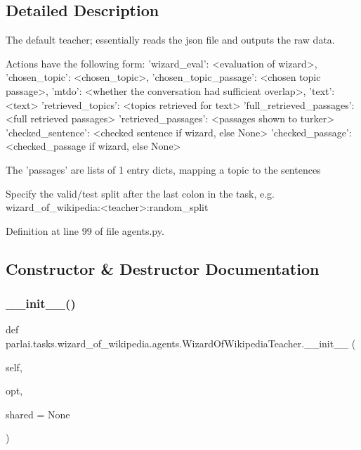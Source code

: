 \subsection{Detailed Description}
\begin{DoxyVerb}The default teacher; essentially reads the json file and outputs the raw data.

Actions have the following form:
{
    'wizard_eval': <evaluation of wizard>,
    'chosen_topic': <chosen_topic>,
    'chosen_topic_passage': <chosen topic passage>,
    'mtdo': <whether the conversation had sufficient overlap>,
    'text': <text>
    'retrieved_topics': <topics retrieved for text>
    'full_retrieved_passages': <full retrieved passages>
    'retrieved_passages': <passages shown to turker>
    'checked_sentence': <checked sentence if wizard, else None>
    'checked_passage': <checked_passage if wizard, else None>
}

The 'passages' are lists of 1 entry dicts, mapping a topic to the sentences

Specify the valid/test split after the last colon in the task, e.g.
wizard_of_wikipedia:<teacher>:random_split
\end{DoxyVerb}
 

Definition at line 99 of file agents.\+py.



\subsection{Constructor \& Destructor Documentation}
\mbox{\label{classparlai_1_1tasks_1_1wizard__of__wikipedia_1_1agents_1_1WizardOfWikipediaTeacher_a364b2b8db4fd8162bd72d29fe4001d90}} 
\subsubsection{\texorpdfstring{\+\_\+\+\_\+init\+\_\+\+\_\+()}{\_\_init\_\_()}}
{\footnotesize\ttfamily def parlai.\+tasks.\+wizard\+\_\+of\+\_\+wikipedia.\+agents.\+Wizard\+Of\+Wikipedia\+Teacher.\+\_\+\+\_\+init\+\_\+\+\_\+ (\begin{DoxyParamCaption}\item[{}]{self,  }\item[{}]{opt,  }\item[{}]{shared = {\ttfamily None} }\end{DoxyParamCaption})}



